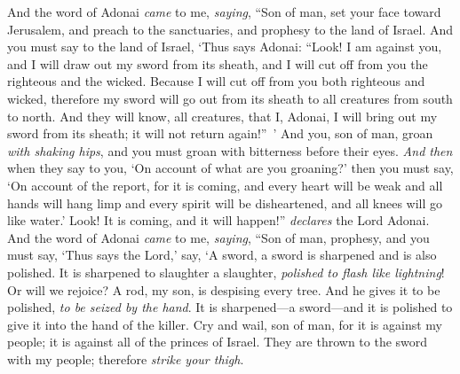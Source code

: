 \begin{biblechapter} %
 And the word of Adonai \textit{came} to me, \textit{saying},
\verse “Son of man, set your face toward Jerusalem, and preach to the sanctuaries, and prophesy to the land of Israel.
\verse And you must say to the land of Israel, ‘Thus says Adonai: “Look! I am against you, and I will draw out my sword from its sheath, and I will cut off from you the righteous and the wicked.
\verse Because I will cut off from you both righteous and wicked, therefore my sword will go out from its sheath to all creatures from south to north.
\verse And they will know, all creatures, that I, Adonai, I will bring out my sword from its sheath; it will not return again!” ’
\verse And you, son of man, groan \textit{with shaking hips}, and you must groan with bitterness before their eyes.
\verse \textit{And then} when they say to you, ‘On account of what are you groaning?’ then you must say, ‘On account of the report, for it is coming, and every heart will be weak and all hands will hang limp and every spirit will be disheartened, and all knees will go like water.’ Look! It is coming, and it will happen!” \textit{declares} the Lord Adonai.
\verse And the word of Adonai \textit{came} to me, \textit{saying},
\verse “Son of man, prophesy, and you must say, ‘Thus says the Lord,’ say, ‘A sword, a sword is sharpened and is also polished.
\verse It is sharpened to slaughter a slaughter, \textit{polished to flash like lightning}! Or will we rejoice? A rod, my son, is despising every tree.
\verse And he gives it to be polished, \textit{to be seized by the hand}. It is sharpened—a sword—and it is polished to give it into the hand of the killer.
\verse Cry and wail, son of man, for it is against my people; it is against all of the princes of Israel. They are thrown to the sword with my people; therefore \textit{strike your thigh}.

\end{biblechapter}
